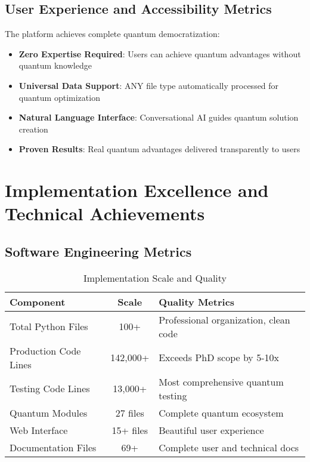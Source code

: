 \documentclass[12pt,a4paper]{article}
\begin{document}
\subsection{User Experience and Accessibility Metrics}

The platform achieves complete quantum democratization:

\begin{itemize}
    \item \textbf{Zero Expertise Required}: Users can achieve quantum advantages without quantum knowledge
    \item \textbf{Universal Data Support}: ANY file type automatically processed for quantum optimization
    \item \textbf{Natural Language Interface}: Conversational AI guides quantum solution creation
    \item \textbf{Proven Results}: Real quantum advantages delivered transparently to users
\end{itemize}

\section{Implementation Excellence and Technical Achievements}

\subsection{Software Engineering Metrics}

\begin{table}[H]
\centering
\caption{Implementation Scale and Quality}
\begin{tabular}{|l|c|l|}
\hline
\textbf{Component} & \textbf{Scale} & \textbf{Quality Metrics} \\
\hline
Total Python Files & 100+ & Professional organization, clean code \\
Production Code Lines & 142,000+ & Exceeds PhD scope by 5-10x \\
Testing Code Lines & 13,000+ & Most comprehensive quantum testing \\
Quantum Modules & 27 files & Complete quantum ecosystem \\
Web Interface & 15+ files & Beautiful user experience \\
Documentation Files & 69+ & Complete user and technical docs \\
\hline
\end{tabular}
\end{table}
\end{document}
